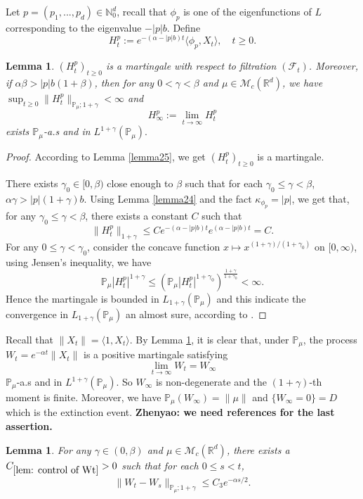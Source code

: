 \documentclass[12pt,oneside,english]{amsart}
\theoremstyle{plain}
\newtheorem{lem}[thm]{Lemma}
\theoremstyle{definition}
\numberwithin{equation}{section}
\begin{document}
    Let $p=(p_1,...,p_d)\in \mathbb N_0^d$, recall that $\phi_p$ is one of the eigenfunctions of $L$ corresponding to the eigenvalue $-|p|b$. Define
$$H_t^p:=e^{-(\alpha-|p|b)t}\langle\phi_p,X_t\rangle, \quad t\geq 0.$$

\begin{lem}\label{lemma26}
    $(H^p_t)_{t\geq 0}$ is a martingale with respect to filtration $(\mathscr F_t)$.
    Moreover, if $\alpha\beta>|p|b(1+\beta)$, then for any $0< \gamma<\beta$ and $\mu \in \mathcal M_c(\mathbb R^d)$, we have $\sup_{t\geq 0}\|H_t^p\|_{\mathbb P_\mu;1+\gamma}< \infty$ and
$$H_{\infty}^p:=\lim_{t\rightarrow \infty}H_t^p$$
exists $\mathbb{P}_{\mu}$-a.s and in $L^{1+\gamma}(\mathbb{P}_{\mu}).$
\end{lem}
\begin{proof}
    According to Lemma \ref{lemma25}, we get $(H_t^p)_{t\geq 0}$ is a martingale.

    There exists $\gamma_0 \in [0,\beta)$ close enough to $\beta$ such that for each $\gamma_0 \leq \gamma < \beta$, $\alpha\gamma>|p|(1+\gamma)b$.
    Using  Lemma \ref{lemma24} and the fact $\kappa_{\phi_p}=|p|$, we get that, for any $\gamma_0\leq\gamma<\beta$, there exists a constant $C$ such that
    $$\|H_t^p\|_{1+\gamma}\leq Ce^{-(\alpha-|p|b)t}e^{(\alpha-|p|b)t}=C.$$
    For any $0\leq\gamma<\gamma_0$, consider the concave function $x\mapsto x^{(1+\gamma)/(1+\gamma_0)}$ on $[0,\infty)$, using Jensen's inequality, we have
    $$\mathbb{P}_{\mu}|H_t^p|^{1+\gamma}\leq(\mathbb{P}_{\mu}|H_t^p|^{1+\gamma_0})^{\frac{1+\gamma}{1+\gamma_0}}<\infty.$$
    Hence the martingale is bounded in $L_{1+\gamma}(\mathbb{P}_{\mu})$ and this indicate the convergence in $L_{1+\gamma}(\mathbb{P}_{\mu}) $ an almost sure,
    according to \cite[Theorem 5.4.5]{Durrett2010Probability}.
\end{proof}


    Recall that $\|X_t\|=\langle 1,X_t\rangle$.
    By Lemma \ref{lemma26},
    it is clear that,
    under $\mathbb{P}_{\mu}$, the process $W_t=e^{-\alpha t}\|X_t\|$ is a positive martingale satisfying
$$\lim_{t\rightarrow \infty} W_t= W_{\infty}$$
$\mathbb{P}_{\mu}$-a.s and in $L^{1+\gamma}(\mathbb{P}_{\mu})$. So $W_{\infty}$ is non-degenerate and the $(1+\gamma)$-th moment is finite. Moreover,  we have $\mathbb{P}_{\mu}(W_{\infty})=\|\mu\|$ and $\{W_{\infty}=0\}=D$ which is the extinction event.
    {\bf Zhenyao: we need references for the last assertion.}
\begin{lem}\label{lem: control of Wt}
 For any $\gamma\in (0,\beta)$ and $\mu\in \mathcal M_c(\mathbb R^d)$, there exists a $C_{\ref{lem: control of Wt}}> 0$ such that for each $0\leq s<t$,
 $$\|W_t-W_s\|_{\mathbb{P}_{\mu};1+\gamma}\leq C_3 e^{-\alpha s/2}.$$
\end{lem}
\end{document}
